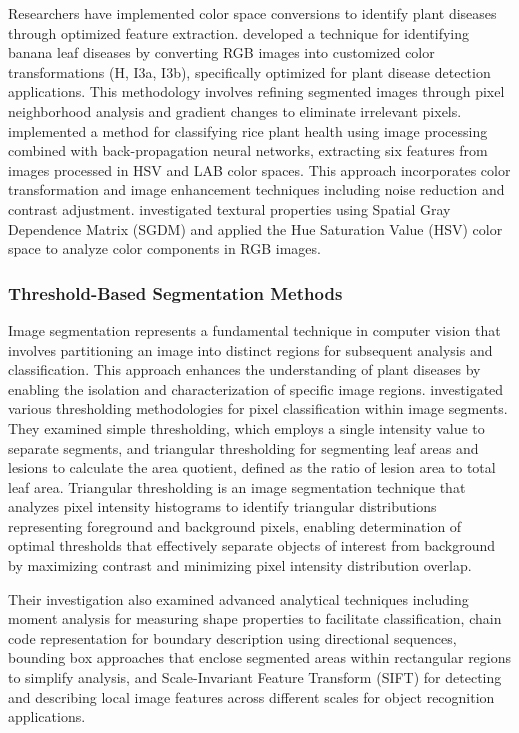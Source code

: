 \documentclass[sn-mathphys]{sn-jnl}
\theoremstyle{thmstyleone}%
\theoremstyle{thmstyletwo}%
\theoremstyle{thmstylethree}%
\begin{document}
Researchers have implemented color space conversions to identify plant diseases through optimized feature extraction. \citet{camargo2009image} developed a technique for identifying banana leaf diseases by converting RGB images into customized color transformations (H, I3a, I3b), specifically optimized for plant disease detection applications. This methodology involves refining segmented images through pixel neighborhood analysis and gradient changes to eliminate irrelevant pixels. \citet{orillo2014rice} implemented a method for classifying rice plant health using image processing combined with back-propagation neural networks, extracting six features from images processed in HSV and LAB color spaces. This approach incorporates color transformation and image enhancement techniques including noise reduction and contrast adjustment. \citet{dhaygude2013agricultural} investigated textural properties using Spatial Gray Dependence Matrix (SGDM) and applied the Hue Saturation Value (HSV) color space to analyze color components in RGB images.


\subsubsection{Threshold-Based Segmentation Methods}

Image segmentation represents a fundamental technique in computer vision that involves partitioning an image into distinct regions for subsequent analysis and classification. This approach enhances the understanding of plant diseases by enabling the isolation and characterization of specific image regions. \citet{patil2011leaf} investigated various thresholding methodologies for pixel classification within image segments. They examined simple thresholding, which employs a single intensity value to separate segments, and triangular thresholding for segmenting leaf areas and lesions to calculate the area quotient, defined as the ratio of lesion area to total leaf area. Triangular thresholding is an image segmentation technique that analyzes pixel intensity histograms to identify triangular distributions representing foreground and background pixels, enabling determination of optimal thresholds that effectively separate objects of interest from background by maximizing contrast and minimizing pixel intensity distribution overlap.

Their investigation also examined advanced analytical techniques including moment analysis for measuring shape properties to facilitate classification, chain code representation for boundary description using directional sequences, bounding box approaches that enclose segmented areas within rectangular regions to simplify analysis, and Scale-Invariant Feature Transform (SIFT) for detecting and describing local image features across different scales for object recognition applications.
\end{document}
